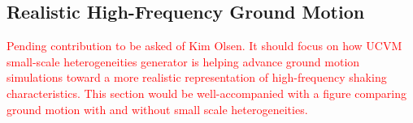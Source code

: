 
\subsection{Realistic High-Frequency Ground Motion}

\textcolor{red}{Pending contribution to be asked of Kim Olsen. It should focus on how UCVM small-scale heterogeneities generator is helping advance ground motion simulations toward a more realistic representation of high-frequency shaking characteristics. This section would be well-accompanied with a figure comparing ground motion with and without small scale heterogeneities.}


